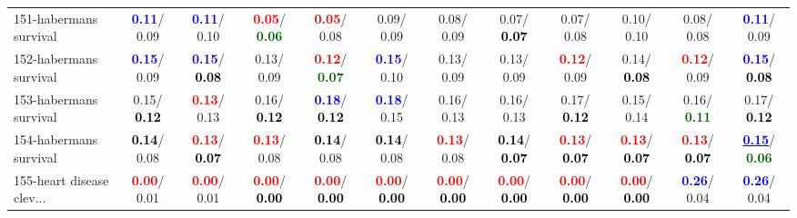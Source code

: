\begin{table}[h]
\begin{center}
{\begin{tabular}{lc|c|c|c|c|c|c|c|c|c|c}
151-habermans survival & \textcolor{blue}{\textbf{  0.11}}/  0.09 & \textcolor{blue}{\textbf{  0.11}}/  0.10 & \textcolor{red}{\textbf{  0.05}}/\textcolor{darkgreen}{\textbf{  0.06}} & \textcolor{red}{\textbf{  0.05}}/  0.08 &   0.09/  0.09 &   0.08/  0.09 &   0.07/\textcolor{black}{\textbf{  0.07}} &   0.07/  0.08 &   0.10/  0.10 &   0.08/  0.08 & \textcolor{blue}{\textbf{  0.11}}/  0.09 \\
152-habermans survival & \textcolor{blue}{\textbf{  0.15}}/  0.09 & \textcolor{blue}{\textbf{  0.15}}/\textcolor{black}{\textbf{  0.08}} &   0.13/  0.09 & \textcolor{red}{\textbf{  0.12}}/\textcolor{darkgreen}{\textbf{  0.07}} & \textcolor{blue}{\textbf{  0.15}}/  0.10 &   0.13/  0.09 &   0.13/  0.09 & \textcolor{red}{\textbf{  0.12}}/  0.09 &   0.14/\textcolor{black}{\textbf{  0.08}} & \textcolor{red}{\textbf{  0.12}}/  0.09 & \textcolor{blue}{\textbf{  0.15}}/\textcolor{black}{\textbf{  0.08}} \\
153-habermans survival &   0.15/\textcolor{black}{\textbf{  0.12}} & \textcolor{red}{\textbf{  0.13}}/  0.13 &   0.16/\textcolor{black}{\textbf{  0.12}} & \textcolor{blue}{\textbf{  0.18}}/\textcolor{black}{\textbf{  0.12}} & \textcolor{blue}{\textbf{  0.18}}/  0.15 &   0.16/  0.13 &   0.16/  0.13 &   0.17/\textcolor{black}{\textbf{  0.12}} &   0.15/  0.14 &   0.16/\textcolor{darkgreen}{\textbf{  0.11}} &   0.17/\textcolor{black}{\textbf{  0.12}} \\
154-habermans survival & \textcolor{black}{\textbf{  0.14}}/  0.08 & \textcolor{red}{\textbf{  0.13}}/\textcolor{black}{\textbf{  0.07}} & \textcolor{red}{\textbf{  0.13}}/  0.08 & \textcolor{black}{\textbf{  0.14}}/  0.08 & \textcolor{black}{\textbf{  0.14}}/  0.08 & \textcolor{red}{\textbf{  0.13}}/  0.08 & \textcolor{black}{\textbf{  0.14}}/\textcolor{black}{\textbf{  0.07}} & \textcolor{red}{\textbf{  0.13}}/\textcolor{black}{\textbf{  0.07}} & \textcolor{red}{\textbf{  0.13}}/\textcolor{black}{\textbf{  0.07}} & \textcolor{red}{\textbf{  0.13}}/\textcolor{black}{\textbf{  0.07}} & \underline{\textcolor{blue}{\textbf{  0.15}}}/\textcolor{darkgreen}{\textbf{  0.06}} \\
155-heart disease clev... & \textcolor{red}{\textbf{  0.00}}/  0.01 & \textcolor{red}{\textbf{  0.00}}/  0.01 & \textcolor{red}{\textbf{  0.00}}/\textcolor{black}{\textbf{  0.00}} & \textcolor{red}{\textbf{  0.00}}/\textcolor{black}{\textbf{  0.00}} & \textcolor{red}{\textbf{  0.00}}/\textcolor{black}{\textbf{  0.00}} & \textcolor{red}{\textbf{  0.00}}/\textcolor{black}{\textbf{  0.00}} & \textcolor{red}{\textbf{  0.00}}/\textcolor{black}{\textbf{  0.00}} & \textcolor{red}{\textbf{  0.00}}/\textcolor{black}{\textbf{  0.00}} & \textcolor{red}{\textbf{  0.00}}/\textcolor{black}{\textbf{  0.00}} & \textcolor{blue}{\textbf{  0.26}}/  0.04 & \textcolor{blue}{\textbf{  0.26}}/  0.04 \\

\end{tabular}}
\end{center}
\end{table}
